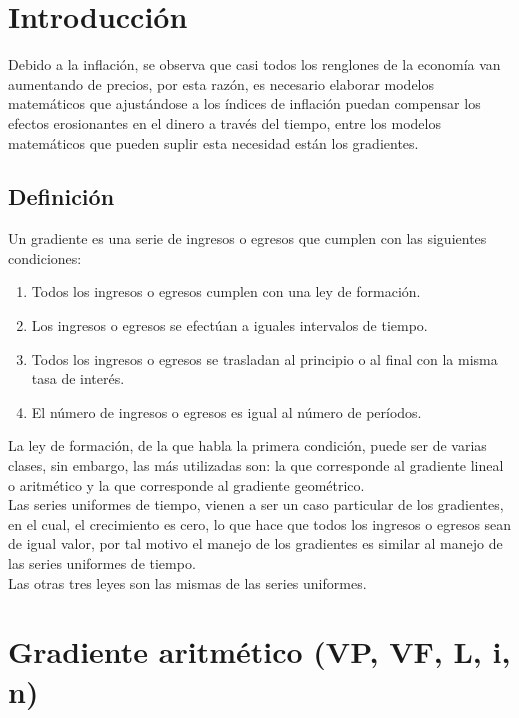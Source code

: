 \section{Introducción}


Debido a la inflación, se observa que casi todos los renglones de la economía van aumentando de precios, por esta razón, es necesario elaborar modelos matemáticos que ajustándose a los índices de inflación puedan compensar los efectos erosionantes en el dinero a través del tiempo, entre los modelos matemáticos que pueden suplir esta necesidad están los gradientes.\\

\subsection{Definición}

Un gradiente es una serie de ingresos o egresos que cumplen con las siguientes condiciones:\\
\begin{enumerate}
	\item Todos los ingresos o egresos cumplen con una ley de formación.
	\item Los ingresos o egresos se efectúan a iguales intervalos de tiempo.
	\item Todos los ingresos o egresos se trasladan al principio o al final con la misma tasa de interés.
	\item El número de ingresos o egresos es igual al número de períodos.\\
\end{enumerate}

La ley de formación, de la que habla la primera condición, puede ser de varias clases, sin embargo, las más utilizadas son: la que corresponde al gradiente lineal o aritmético y la que corresponde al gradiente geométrico.\\

Las series uniformes de tiempo, vienen a ser un caso particular de los gradientes, en el cual, el crecimiento es cero, lo que hace que todos los ingresos o egresos sean de igual valor, por tal motivo el manejo de los gradientes es similar al manejo de las series uniformes de tiempo.\\

Las otras tres leyes son las mismas de las series uniformes.\\

\section{Gradiente aritmético (VP, VF, L, i, n)}

